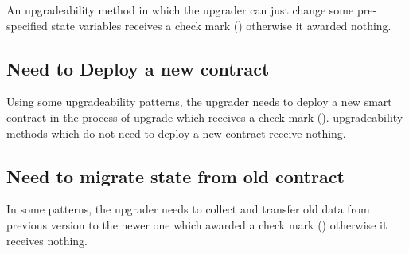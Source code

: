 An upgradeability method in which the upgrader can just change some pre-specified state variables receives a check mark (\checkmark) otherwise it awarded nothing.
 

 





\subsection{Need to Deploy a new contract}

Using some upgradeability patterns, the upgrader needs to deploy a new smart contract in the process of upgrade which receives a check mark (\checkmark). upgradeability methods which do not need to deploy a new contract receive nothing.

\subsection{Need to migrate state from old contract}

In some patterns, the upgrader needs to collect and transfer old data from previous version to the newer one which awarded a check mark (\checkmark) otherwise it receives nothing. 

